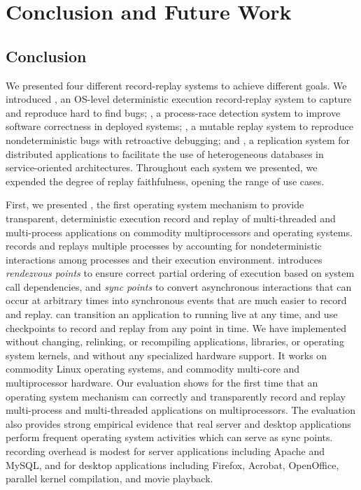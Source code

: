 \chapter{Conclusion and Future Work}
\label{ch:conclusion}

\section{Conclusion}

We presented four different record-replay systems to achieve different goals.
We introduced \scribe, an OS-level deterministic execution record-replay system
to capture and reproduce hard to find bugs; \racepro, a process-race detection
system to improve software correctness in deployed systems; \dora, a mutable
replay system to reproduce nondeterministic bugs with retroactive debugging;
and \synapse, a replication system for distributed
applications to facilitate the use of heterogeneous databases in
service-oriented architectures.
Throughout each system we presented, we expended the degree of replay
faithfulness, opening the range of use cases.

First, we presented \scribe{}, the first operating system mechanism to provide
transparent, deterministic execution record and replay of multi-threaded and
multi-process applications on commodity multiprocessors and operating systems.
\scribe{} records and replays multiple processes by accounting for
nondeterministic interactions among processes and their execution environment.
\scribe{} introduces {\em rendezvous points} to ensure correct partial ordering
of execution based on system call dependencies, and {\em sync points} to convert
asynchronous interactions that can occur at arbitrary times into synchronous
events that are much easier to record and replay.  \scribe{} can transition an
application  to running live at any time, and use checkpoints to record and
replay from any point in time.
We have implemented \scribe{} without changing, relinking, or
recompiling applications, libraries, or operating system kernels, and
without any specialized hardware support. It works on commodity Linux
operating systems, and commodity multi-core and multiprocessor
hardware.  Our evaluation shows for the first time that an operating
system mechanism can correctly and transparently record and replay
multi-process and multi-threaded applications on multiprocessors.  The
evaluation also provides strong empirical evidence that 
real server and desktop applications perform frequent
operating system activities which can serve as sync points.
\scribe{} recording overhead is modest for server applications including Apache
and MySQL, and for desktop applications including Firefox, Acrobat, OpenOffice,
parallel kernel compilation, and movie playback.

